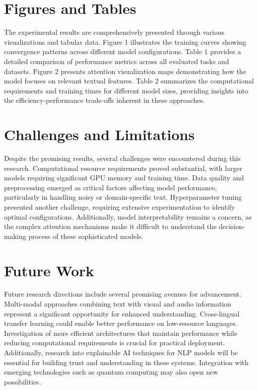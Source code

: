 \documentclass[conference]{IEEEtran}
\begin{document}
\section{Figures and Tables}
The experimental results are comprehensively presented through various visualizations and tabular data. Figure 1 illustrates the training curves showing convergence patterns across different model configurations. Table 1 provides a detailed comparison of performance metrics across all evaluated tasks and datasets. Figure 2 presents attention visualization maps demonstrating how the model focuses on relevant textual features. Table 2 summarizes the computational requirements and training times for different model sizes, providing insights into the efficiency-performance trade-offs inherent in these approaches.

\section{Challenges and Limitations}
Despite the promising results, several challenges were encountered during this research. Computational resource requirements proved substantial, with larger models requiring significant GPU memory and training time. Data quality and preprocessing emerged as critical factors affecting model performance, particularly in handling noisy or domain-specific text. Hyperparameter tuning presented another challenge, requiring extensive experimentation to identify optimal configurations. Additionally, model interpretability remains a concern, as the complex attention mechanisms make it difficult to understand the decision-making process of these sophisticated models.

\section{Future Work}
Future research directions include several promising avenues for advancement. Multi-modal approaches combining text with visual and audio information represent a significant opportunity for enhanced understanding. Cross-lingual transfer learning could enable better performance on low-resource languages. Investigation of more efficient architectures that maintain performance while reducing computational requirements is crucial for practical deployment. Additionally, research into explainable AI techniques for NLP models will be essential for building trust and understanding in these systems. Integration with emerging technologies such as quantum computing may also open new possibilities.
\end{document}
